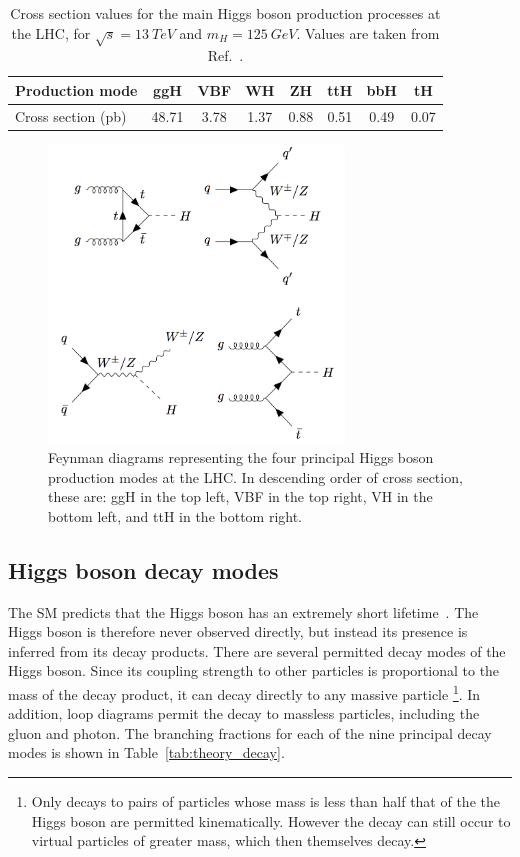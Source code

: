 \begin{table}
  \centering
  \begin{tabular}{ l | c c c c c c c }
      \hline
      Production mode & ggH & VBF & WH & ZH & ttH & bbH & tH  \\
      \hline
      Cross section (pb) & 48.71 & 3.78 & 1.37 & 0.88 & 0.51 & 0.49 & 0.07 \\
      \hline
  \end{tabular}%
  \caption{
  Cross section values for the main Higgs boson production processes at the LHC, 
  for $\sqrt{s}=\SI{13}{TeV}$ and $m_H = \SI{125}{GeV}$.
  Values are taken from Ref.~\cite{YR4}.
  }
  \label{tab:theory_prod}
\end{table}

\begin{figure}[hptb]
  \centering
  \includegraphics[width=0.7\textwidth]{Figures/Theory/FeynProd.png}
  \caption[Feynman diagrams of four Higgs boson production modes.]
  {
    Feynman diagrams representing the four principal Higgs boson production modes at the LHC.
    In descending order of cross section, these are: ggH in the top left, VBF in the top right, 
    VH in the bottom left, and ttH in the bottom right.
  }
  \label{fig:theory_FeynProd}
\end{figure}

\subsection{Higgs boson decay modes}

The SM predicts that the Higgs boson has an extremely short lifetime~\cite{YR4}.
The Higgs boson is therefore never observed directly, 
but instead its presence is inferred from its decay products.
There are several permitted decay modes of the Higgs boson.
Since its coupling strength to other particles is proportional to the mass of the decay product, 
it can decay directly to any massive particle
\footnote{Only decays to pairs of particles whose mass is less than half that of the the Higgs boson
are permitted kinematically. 
However the decay can still occur to virtual particles of greater mass, 
which then themselves decay.}.
In addition, loop diagrams permit the decay to massless particles, including the gluon and photon.
The branching fractions for each of the nine principal decay modes 
is shown in Table~\ref{tab:theory_decay}.


